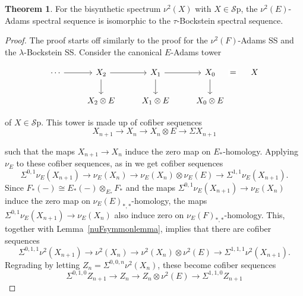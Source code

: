 \documentclass[10pt]{amsart}
\theoremstyle{definition}
\numberwithin{figure}{section}
\numberwithin{equation}{section}
\newtheorem{thm}[figure]{Theorem}
\theoremstyle{cited}
\newcommand{\Sp}{{\mathcal{S}\mathrm{p}}}
\begin{document}
\begin{thm}
    For the bisynthetic spectrum $\nu^2(X)$ with $X\in\Sp$, the $\nu^2(E)$-Adams spectral sequence is isomorphic to the $\tau$-Bockstein spectral sequence. 
\end{thm}

\begin{proof}
The proof starts off similarly to the proof for the $\nu^2(F)$-Adams SS and the $\lambda$-Bockstein SS. Consider the canonical $E$-Adams tower

\begin{equation*}
	\begin{tikzcd}
\cdots \arrow[r] & X_2 \arrow[r] \arrow[d] & X_1 \arrow[r] \arrow[d] & X_0 \arrow[r, phantom, "{=}" description] \ar[d] & X \\
                 & X_2\otimes E      & X_1\otimes E      & X_0\otimes E &     
\end{tikzcd}
\end{equation*}

of $X\in\Sp$. This tower is made up of cofiber sequences
\begin{equation*}
X_{n+1}\to X_n\to X_n\otimes E\to\Sigma X_{n+1}
\end{equation*}

such that the maps $X_{n+1}\to X_n$ induce the zero map on $E_*$-homology. Applying $\nu_E$ to these cofiber sequences, as in \cite{BHS19} we get cofiber sequences
$$
\Sigma^{0,1}\nu_E(X_{n+1})\to \nu_E(X_n)\to \nu_E(X_n)\otimes \nu_E(E)\to\Sigma^{1,1} \nu_E(X_{n+1}).
$$
Since $F_*(-)\cong E_*(-)\otimes_{E_*}F_*$ and the maps $\Sigma^{0,1}\nu_E(X_{n+1})\to\nu_E(X_n)$ induce the zero map on $\nu_E(E)_{*,*}$-homology, the maps $\Sigma^{0,1}\nu_E(X_{n+1})\to\nu_E(X_n)$ also induce zero on $\nu_E(F)_{*,*}$-homology. This, together with Lemma~\ref{nuFsymmonlemma}, implies that there are cofiber sequences
$$
\Sigma^{0,1,1}\nu^2(X_{n+1})\to \nu^2(X_n)\to \nu^2(X_n)\otimes \nu^2(E)\to\Sigma^{1,1,1} \nu^2(X_{n+1}).
$$
Regrading by letting $Z_n=\Sigma^{0,0,n}\nu^2(X_n)$, these become cofiber sequences
$$
\Sigma^{0,1,0}Z_{n+1}\to Z_n\to Z_n\otimes \nu^2(E)\to\Sigma^{1,1,0} Z_{n+1}
$$


\end{proof}
\end{document}
